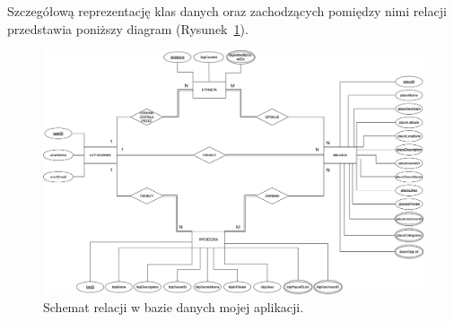 		Szczegółową reprezentację klas danych oraz zachodzących pomiędzy nimi relacji przedstawia poniższy diagram (Rysunek~\ref{relations}).

		\vspace{1cm}
        \begin{figure}[!ht]%
            \centering
            \includegraphics[scale=0.34]{src/relations_diagram.png}
            \caption{Schemat relacji w bazie danych mojej aplikacji.\label{relations}}
            \qquad
        \end{figure} 


